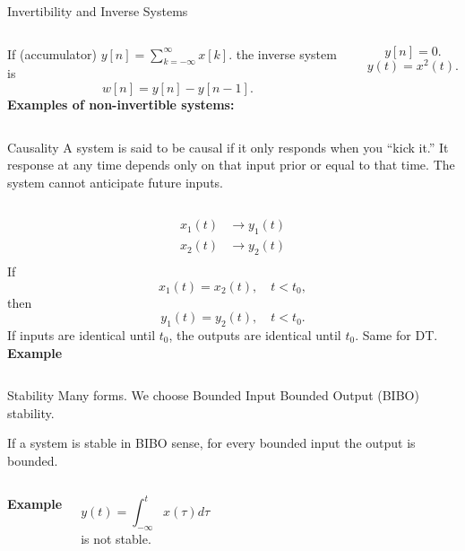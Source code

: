 \begin{frame}{Invertibility and Inverse Systems}
\begin{columns}
        If (accumulator)
        $
                y[n] = \sum_{k=-\infty}^{\infty}x[k].
        $
            the inverse system is
        \begin{equation*}
            w[n] = y[n] - y[n-1].
        \end{equation*}
        \textbf{ Examples of non-invertible systems:}\par
        \begin{equation*}
            y[n] = 0.
        \end{equation*}
        \begin{equation*}
            y(t) = x^2(t).
        \end{equation*}
    \end{columns}
\end{frame}



\begin{frame}{Causality}
    A system is said to be causal if it only responds when you ``kick it.'' It response at any time depends only on that input prior or equal to that time. The system cannot anticipate future inputs.

    \begin{columns}
            \begin{align*}
              x_1(t) &\rightarrow y_1(t) \\
              x_2(t) &\rightarrow y_2(t) \\
            \end{align*}
            If
            \begin{equation*}
                x_1(t) = x_2(t) , \quad t < t_0,
            \end{equation*}
            then
            \begin{equation*}
                y_1(t) = y_2(t) , \quad t < t_0.
            \end{equation*}
            If inputs are identical until $t_0$, the outputs are identical until $t_0$. Same for DT.
        \textbf{ Example}
    \end{columns}
\end{frame}

\begin{frame}{Stability}
    Many forms. We choose Bounded Input Bounded Output (BIBO) stability.\par
    If a system is stable in BIBO sense, for every bounded input the output is bounded.
    {
        \begin{columns}
            \textbf{ Example}\par
            \begin{equation*}
                y(t) = \int_{-\infty}^{t}x(\tau)d\tau
            \end{equation*}
            is not stable.
        \end{columns}
    }
\end{frame}

